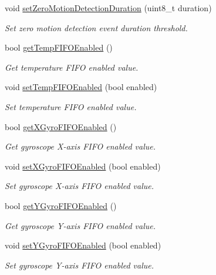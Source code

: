 \begin{DoxyCompactItemize}
void \mbox{\hyperlink{classMPU6050_a6d25a21e1673682f096399b719c66d2c}{set\+Zero\+Motion\+Detection\+Duration}} (uint8\+\_\+t duration)
\begin{DoxyCompactList}\small\item\em Set zero motion detection event duration threshold. \end{DoxyCompactList}\item 
bool \mbox{\hyperlink{classMPU6050_a913c2095001e204b5b09f8382a86d2ca}{get\+Temp\+F\+I\+F\+O\+Enabled}} ()
\begin{DoxyCompactList}\small\item\em Get temperature F\+I\+FO enabled value. \end{DoxyCompactList}\item 
void \mbox{\hyperlink{classMPU6050_ae528a25b4997ad0e3091a012e4e4419e}{set\+Temp\+F\+I\+F\+O\+Enabled}} (bool enabled)
\begin{DoxyCompactList}\small\item\em Set temperature F\+I\+FO enabled value. \end{DoxyCompactList}\item 
bool \mbox{\hyperlink{classMPU6050_ada9a553176b57815f23fb7d71bb85c9d}{get\+X\+Gyro\+F\+I\+F\+O\+Enabled}} ()
\begin{DoxyCompactList}\small\item\em Get gyroscope X-\/axis F\+I\+FO enabled value. \end{DoxyCompactList}\item 
void \mbox{\hyperlink{classMPU6050_a53a03d1f255a62f01375c870cdc85767}{set\+X\+Gyro\+F\+I\+F\+O\+Enabled}} (bool enabled)
\begin{DoxyCompactList}\small\item\em Set gyroscope X-\/axis F\+I\+FO enabled value. \end{DoxyCompactList}\item 
bool \mbox{\hyperlink{classMPU6050_a86c85d5b5c93df82394435b868e17463}{get\+Y\+Gyro\+F\+I\+F\+O\+Enabled}} ()
\begin{DoxyCompactList}\small\item\em Get gyroscope Y-\/axis F\+I\+FO enabled value. \end{DoxyCompactList}\item 
void \mbox{\hyperlink{classMPU6050_a16eb12bbf07bc17a9d852941d834175e}{set\+Y\+Gyro\+F\+I\+F\+O\+Enabled}} (bool enabled)
\begin{DoxyCompactList}\small\item\em Set gyroscope Y-\/axis F\+I\+FO enabled value. \end{DoxyCompactList}\item 

\end{DoxyCompactItemize}
